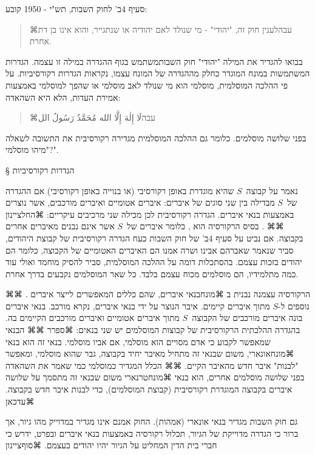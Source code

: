 סעיף 4ב' לחוק השבות, תש"י - 1950 קובע:
\begin{quote}
⌘עבה{לענין חוק זה, "יהודי" - מי שנולד לאם יהודיה או שנתגייר, והוא אינו בן דת אחרת}.
\end{quote}
 בבואו להגדיר את המילה "יהודי" חוק השבותמשתמש בגוף ההגדרה במילה זו עצמה. הגדרות המשתמשות במונח המוגדר כחלק מההגדרה של המונח עצמו, נקראות הגדרות רקורסיביות. על פי ההלכה המוסלמית, מוסלמי הוא מי שנולד לאב מוסלמי או שהפך למוסלמי באמצעות אמירת העדות, הלא היא השהאדה:
\begin{quote}
\begin{Arabic}
  ⌘עבה{لَا إِلٰهَ إِلَّا الله مُحَمَّدٌ رَسُولُ الل}
  \end{Arabic}
\end{quote}

בפני שלושה מוסלמים. כלומר גם ההלכה המוסלמית מגדירה רקורסיבית את התשובה לשאלה "מיהו מוסלמי?".

§ הגדרות רקורסיביות

נאמר על קבוצה~$S$ שהיא מוגדרת באופן רקורסיבי (או בנוייה באופן רקורסיבי) אם ההגדרה של~$S$ מבדילה בין שני סוגים של איברים: איברים אטומיים ואיברים מורכבים, אשר נוצרים באמצעות בנאי איברים. הגדרה רקורסיבית לכן מכילה שני מרכיבים עיקריים:
⌘החל{ציינון}
⌘⌘ . בסיס הרקורסיה הוא ,
כלומר איברים של~$S$ אשר אינם נבנים מאיברים אחרים בקבוצה. אם נביט על סעיף 4ב' של
חוק השבות כעח הגדרה רקורסיבית של קבוצת היהודים, סביר שנאמר שאברהם אבינו ושרה
אמנו הם האיברים האטומיים של הקבוצה, כלומר הם יהודים בזכות עצמם. בהסתכלות דומה
על ההלכה המוסלמית, סביר להסיק מוחמד ואולי עוד כמה מתלמידיו, הם מוסלמים מכוח
עצמם בלבד. כל שאר המוסלמים נקבעים בדרך אחרת.

⌘⌘ . הרקורסיה עצמנה נבנית ב ⌘מונח{בנאי איברים}, שהם כללים
המאפשרים לייצר איברים נוספים ל-$S$ מתוך איברים קיימים. איבר הנוצר על ידי בנאי
איברים, נקרא מורכב. בנאי איברים בונה איברים מורכבים של הקבוצה~$S$ מתוך איברים
אטומיים ואיברים מורכבים הקיימים בה. בהגדרה ההלכתית הרקורסיבית של קבוצות המוסלמים יש
שני בנאים: ⌘ספרר
⌘⌘ הבנאי שמאפשר לקבוע כי אדם מסויים הוא מוסלמי, אם אביו מוסלמי. בנאי זה הוא
בנאי ⌘מונח{אונארי}, משום שבנאי זה מתחיל מאיבר יחיד בקבוצה, גבר שהוא מוסלמי,
ומאפשר "לבנות" איבר חדש מהאיבר הקיים.
⌘⌘ הכלל המגדיר כמוסלמי כמי שאמר את השהאדה בפני שלושה מוסלמים אחרים, הוא
בנאי ⌘מונח{טרנארי} משום שבנאי זה מתסמך על שלושה איברים בקבוצה המוגדרת רקורסיבית
(קבוצת המוסלמים), כדי לבנות איבר חדש בקבוצה.
⌘עדכאן

גם חוק השבות מגדיר בנאי אונארי (אמהות). החוק אמנם אינו מגדיר
במדוייק מהו גיור, אך ברור כי הגדרה מדוייקת של הגיור, תכלול רקורסיה באמצעות בנאי
איברים ובפרט, ידרש כי חברי בית הדין המחליט על הגיור יהיו יהודים בעצמם.
⌘סוף{ציינון}


